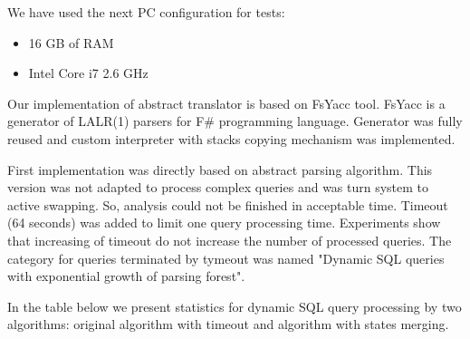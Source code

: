 \documentclass{llncs}
\begin{document}
We have used the next PC configuration for tests: 
\begin{itemize}
    \item 16 GB of RAM
    \item Intel Core i7 2.6 GHz
\end{itemize}

Our implementation of abstract translator is based on FsYacc tool. FsYacc is a generator of LALR(1) parsers for F\# programming language. Generator was fully reused and custom interpreter with stacks copying mechanism was implemented. 

First implementation was directly based on abstract parsing algorithm. This version was not adapted to process complex queries and was turn system to active swapping. So, analysis could not be finished in acceptable time. Timeout (64 seconds) was added to limit one query processing time. Experiments show that increasing of timeout do not increase the number of processed queries. The category for queries terminated by tymeout was named "Dynamic SQL queries with exponential growth of parsing forest".

In the table below we present statistics for dynamic SQL query processing by two algorithms: original algorithm with timeout and algorithm with states merging.
\end{document}

